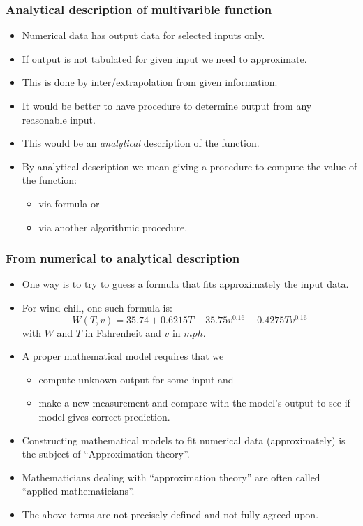 \begin{frame}\frametitle{Analytical description of multivarible function}

\begin{itemize}
\item Numerical data has output data for selected inputs only. 
\item If output is not tabulated for given input we need to approximate.
\item This is done by inter/extrapolation from given information. 
\item It would be better to have procedure to determine output from any reasonable input. 
\item This would be an \emph{analytical} description of the function. 
\item By analytical description we mean giving a procedure to compute the value of the function:
\begin{itemize}
\item via formula or
\item via another algorithmic procedure.
\end{itemize}

\end{itemize}
\end{frame}
\begin{frame}\frametitle{From numerical to analytical description}

\begin{itemize}
\item<1-> One way is to try to guess a formula that fits approximately the input data. 
\item<2-> For wind chill, one such formula is:
$$W(T,v)= 35.74+0.6215 T - 35.75 v^{0.16} +0.4275 Tv^{0.16}$$
  with $W$ and $T$ in Fahrenheit and $v$ in $mph$.
\item<3-> A proper mathematical model requires that we
\begin{itemize}
\item<4-> compute unknown output for some input and 
\item<5-> make a new measurement and compare with the model's output to see if model gives correct prediction.
\end{itemize}
\item<6-> Constructing mathematical models to fit numerical data (approximately) is the subject of ``\alert<8>{Approximation theory}''. 
\item<7-> Mathematicians dealing with ``\alert<8>{approximation theory}'' are often called ``applied mathematicians''.
\item<8-> The \alert<8>{above terms} are not precisely defined and not fully agreed upon. 
\end{itemize}
\end{frame}
